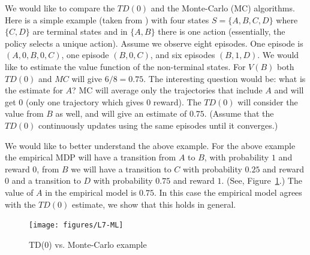 
We would like to compare the $TD(0)$ and the Monte-Carlo (MC)
algorithms. Here is a simple example (taken from \cite{SuttonB98}) with four states
$S=\{A,B,C,D\}$ where $\{C,D\}$ are terminal states and in $\{A,B\}$
there is one action (essentially, the policy selects a unique
action). Assume we observe eight episodes. One episode is
$(A,0,B,0,C)$, one episode $(B,0,C)$, and six episodes $(B,1,D)$. We
would like to estimate the value function of the non-terminal
states. For $V(B)$ both $TD(0)$ and $MC$ will give $6/8=0.75$. The
interesting question would be: what is the estimate for $A$? MC will
average only the trajectories that include $A$ and will get $0$
(only one trajectory which gives $0$ reward). The $TD(0)$ will
consider the value from $B$ as well, and will give an estimate of
$0.75$. (Assume that the $TD(0)$ continuously updates using the same
episodes until it converges.)

We would like to better understand the above example. For the above
example the empirical MDP will have a transition from $A$ to $B$,
with probability $1$ and reward $0$, from $B$ we will have a
transition to $C$ with probability $0.25$ and reward $0$ and a
transition to $D$ with probability $0.75$ and reward $1$. (See,
Figure~\ref{fig:L7-ML}.) The value of $A$ in the empirical model is
$0.75$. In this case the empirical model agrees with the $TD(0)$
estimate, we show that this holds in general.


\begin{figure}[t]
  \begin{centering}
  \texttt{[image: figures/L7-ML]}\\
  \caption{TD(0) vs. Monte-Carlo example}\label{fig:L7-ML}
  \end{centering}
\end{figure}



